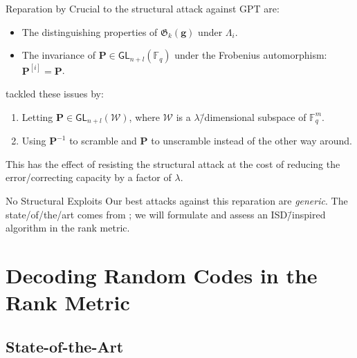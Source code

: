\documentclass[usepdftitle=false]{beamer}
\renewcommand*{\vec}{\symbf}%
\newcommand*{\mat}{\symbf}%
\newcommand*{\GL}{\ensuremath{\mathsf{GL}}}%
\newcommand*{\FF}{\ensuremath{\mathbb{F}}}%
\newcommand*{\Gab}{\ensuremath{\mathfrak{G}}}%
\begin{document}
\begin{frame}{Reparation by \textcite{Loi17}}
  Crucial to the structural attack against GPT are:
  \begin{itemize}
  \item The distinguishing properties of \(\Gab_k(\vec{g})\) under
    \(\Lambda_i\).
  \item The invariance of \(\mat{P} \in \GL_{n + l}(\FF_q)\) under the
    Frobenius automorphism: \(\mat{P}^{[i]} = \mat{P}\).
  \end{itemize}
  \Textcite{Loi17} tackled these issues by:
  \begin{enumerate}
  \item Letting \(\mat{P} \in \GL_{n + l}(\mathcal{W})\), where
    \(\mathcal{W}\) is a \(\lambda\)\=/dimensional subspace of
    \(\FF_q^m\).
  \item Using \(\mat{P}^{-1}\) to scramble and \(\mat{P}\) to
    unscramble instead of the other way around.
  \end{enumerate}
  This has the effect of \alert{resisting the structural attack} at
  the cost of reducing the error\-/correcting capacity by a factor of
  \(\lambda\).
  \begin{alertblock}{No Structural Exploits}
    Our best attacks against this reparation are \emph{generic}.  The
    state\-/of\-/the\-/art comes from \textcite{GRS13}; we will
    formulate and assess an ISD\=/inspired algorithm in the rank
    metric.
  \end{alertblock}
\end{frame}

\section{Decoding Random Codes in the Rank Metric}

\subsection{State-of-the-Art}
\end{document}
